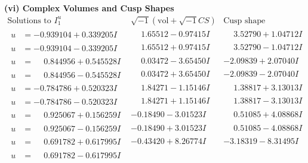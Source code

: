 \documentclass[1p]{elsarticle_modified}
\theoremstyle{definition}
\newcommand{\I}{\sqrt{-1}}
\begin{document}
\newpage\flushleft \textbf{(vi) Complex Volumes and Cusp Shapes}
$$\begin{array}{c|c|c}  
\text{Solutions to }I^u_{1}& \I (\text{vol} + \sqrt{-1}CS) & \text{Cusp shape}\\
 \hline 
\begin{aligned}
u &= -0.939104 + 0.339205 I\end{aligned}
 & \phantom{-}1.65512 - 0.97415 I & \phantom{-}3.52790 + 1.04712 I \\ \hline\begin{aligned}
u &= -0.939104 - 0.339205 I\end{aligned}
 & \phantom{-}1.65512 + 0.97415 I & \phantom{-}3.52790 - 1.04712 I \\ \hline\begin{aligned}
u &= \phantom{-}0.844956 + 0.545528 I\end{aligned}
 & \phantom{-}0.03472 - 3.65450 I & -2.09839 + 2.07040 I \\ \hline\begin{aligned}
u &= \phantom{-}0.844956 - 0.545528 I\end{aligned}
 & \phantom{-}0.03472 + 3.65450 I & -2.09839 - 2.07040 I \\ \hline\begin{aligned}
u &= -0.784786 + 0.520323 I\end{aligned}
 & \phantom{-}1.84271 - 1.15146 I & \phantom{-}1.38817 + 3.13013 I \\ \hline\begin{aligned}
u &= -0.784786 - 0.520323 I\end{aligned}
 & \phantom{-}1.84271 + 1.15146 I & \phantom{-}1.38817 - 3.13013 I \\ \hline\begin{aligned}
u &= \phantom{-}0.925067 + 0.156259 I\end{aligned}
 & -0.18490 - 3.01523 I & \phantom{-}0.51085 + 4.08868 I \\ \hline\begin{aligned}
u &= \phantom{-}0.925067 - 0.156259 I\end{aligned}
 & -0.18490 + 3.01523 I & \phantom{-}0.51085 - 4.08868 I \\ \hline\begin{aligned}
u &= \phantom{-}0.691782 + 0.617995 I\end{aligned}
 & -0.43420 + 8.26774 I & -3.18319 - 8.31495 I \\ \hline\begin{aligned}
u &= \phantom{-}0.691782 - 0.617995 I\end{aligned}

\end{array}$$
\end{document}
